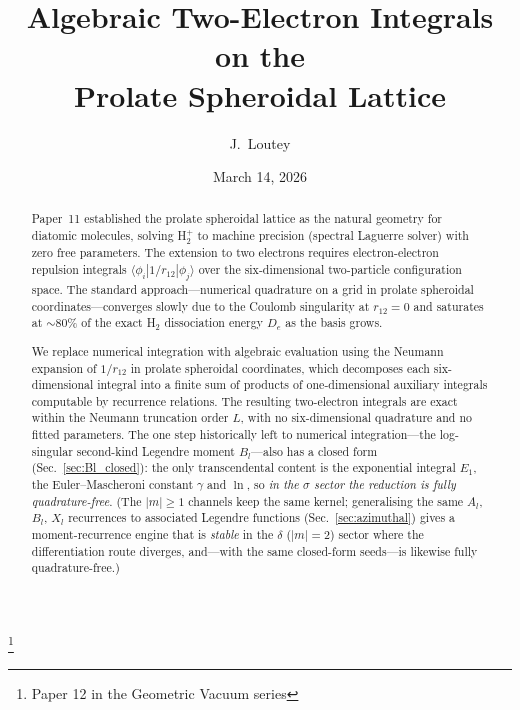\documentclass[aps,pra,twocolumn,superscriptaddress,longbibliography]{revtex4-2}
\begin{document}
\title{Algebraic Two-Electron Integrals on the\\
Prolate Spheroidal Lattice}
\thanks{Paper 12 in the Geometric Vacuum series}

\author{J.~Loutey}

\date{March 14, 2026}


\begin{abstract}
Paper~11 established the prolate spheroidal lattice as the natural
geometry for diatomic molecules, solving H$_2^+$ to machine precision
(spectral Laguerre solver) with zero free parameters.  The extension to two electrons requires
electron-electron repulsion integrals $\langle\phi_i|1/r_{12}|\phi_j\rangle$
over the six-dimensional two-particle configuration space.  The
standard approach---numerical quadrature on a grid in prolate
spheroidal coordinates---converges slowly due to the Coulomb
singularity at $r_{12} = 0$ and saturates at $\sim$80\% of the
exact H$_2$ dissociation energy $D_e$ as the basis grows.

We replace numerical integration with algebraic evaluation using
the Neumann expansion of $1/r_{12}$ in prolate spheroidal
coordinates, which decomposes each six-dimensional integral into a
finite sum of products of one-dimensional auxiliary integrals
computable by recurrence relations.  The resulting two-electron
integrals are exact within the Neumann truncation order $L$, with
no six-dimensional quadrature and no fitted parameters.  The one step
historically left to numerical integration---the log-singular
second-kind Legendre moment $B_l$---also has a closed form
(Sec.~\ref{sec:Bl_closed}): the only transcendental content is the
exponential integral $E_1$, the Euler--Mascheroni constant $\gamma$
and $\ln$, so \emph{in the $\sigma$ sector the reduction is fully
quadrature-free}.  (The $|m| \ge 1$ channels keep the same kernel;
generalising the same $A_l$, $B_l$, $X_l$ recurrences to associated
Legendre functions (Sec.~\ref{sec:azimuthal}) gives a moment-recurrence
engine that is \emph{stable} in the $\delta$ ($|m| = 2$) sector where
the differentiation route diverges, and---with the same closed-form
seeds---is likewise fully quadrature-free.)


\end{abstract}
\end{document}

